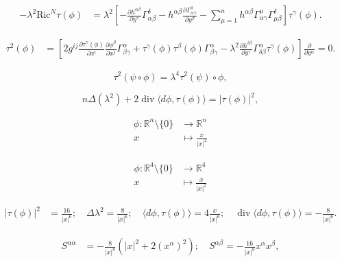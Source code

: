 \documentclass[12pt]{article}
\begin{document}
\begin{align*}
- \lambda^{2} {\mathrm {Ric}}^{N} \tau(\phi) &=  \lambda^{2} \left[ - \frac{\partial
h^{\alpha\beta}}{\partial y^{\gamma}} \Gamma^{\delta}_{\alpha\beta} - h^{\alpha\beta}
\frac{\partial \Gamma^{\delta}_{\alpha\gamma}}{\partial y^{\beta}} - \sum_{\mu
=1}^{n} h^{\alpha\beta} \Gamma^{\mu}_{\alpha\gamma} \Gamma^{\delta}_{\mu\beta}
\right] \tau^{\gamma}(\phi) .
\end{align*}

\begin{align*}
\tau^{2}(\phi)  &= \left[ 2 g^{ij} \frac{\partial \tau^{\gamma}(\phi)}{\partial
x^{i}} \frac{\partial \phi^{\beta}}{\partial x^{j}} \Gamma^{\alpha}_{\beta\gamma} +
\tau^{\gamma}(\phi) \tau^{\beta}(\phi) \Gamma^{\alpha}_{\beta\gamma} - \lambda^{2}
\frac{\partial h^{\delta\beta}}{\partial y^{\gamma}} \Gamma^{\alpha}_{\delta\beta}
\tau^{\gamma}(\phi)\right]  \frac{\partial }{\partial y^{\alpha}}= 0.
\end{align*}

\begin{equation*}
\tau^{2} (\psi\circ\phi) = \lambda^{4} \tau^{2}(\psi) \circ \phi ,
\end{equation*}

\begin{equation}\label{trace}
n \Delta(\lambda^{2}) + 2 \operatorname{div}{\langle d\phi , \tau(\phi)\rangle} = |\tau(\phi)|^{2} ,
\end{equation}

\begin{align*}
\phi : {{\mathbb R}}^{n}\setminus\{0\} &\to {{\mathbb R}}^n \\
x &\mapsto \frac{x}{|x|^2}
\end{align*}

\begin{align*}
\phi : {{\mathbb R}}^{4}\setminus\{0\} &\to {{\mathbb R}}^4 \\
x &\mapsto \frac{x}{|x|^2}
\end{align*}

\begin{align*}
|\tau(\phi)|^2 &= \frac{16}{|x|^6} ; \quad \Delta \lambda^2 = \frac{8}{|x|^6} ; \quad
\langle d\phi,\tau(\phi)\rangle = 4\frac{x}{|x|^6} ; \quad \operatorname{div} \langle
d\phi,\tau(\phi)\rangle = -\frac{8}{|x|^6}.
\end{align*}

\begin{align*}
S^{\alpha\alpha} &= -\tfrac{8}{|x|^8} \left( |x|^2 + 2 (x^{\alpha})^2 \right) ; \quad
S^{\alpha\beta} = -\tfrac{16}{|x|^8}  x^{\alpha}x^{\beta} ,
\end{align*}
\end{document}
